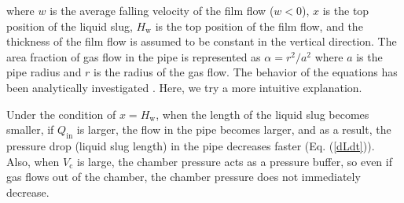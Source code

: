 \documentclass[aps,pre,preprint,groupedaddress,showkeys]{revtex4-2}
\begin{document}
where $ w $ is the average falling velocity of the film flow ($w<0$), $ x $ is the top position of the liquid slug, $ H_ \mathrm {w} $ is the top position of the film flow, and the thickness of the film flow is assumed to be constant in the vertical direction.
The area fraction of gas flow in the pipe is represented as $\alpha = r^2/a^2$ where $a$ is the pipe radius and $r$ is the radius of the gas flow.
The behavior of the equations has been analytically investigated \citep{kanno2018}.
Here, we try a more intuitive explanation.

Under the condition of $ x = H_ \mathrm{w}$, when the length of the liquid slug becomes smaller, if $ Q_ \mathrm {in}$ is larger, the flow in the pipe becomes larger, and as a result, the pressure drop (liquid slug length) in the pipe decreases faster (Eq. (\ref{dLdt})).
Also, when $ V_ \mathrm{c} $ is large, the chamber pressure acts as a pressure buffer, so even if gas flows out of the chamber, the chamber pressure does not immediately decrease.
\end{document}

